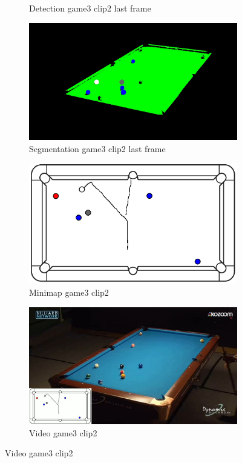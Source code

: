 \begin{figure}[H]
\begin{subfigure}[b]{0.48\textwidth}
		\caption{Detection game3 clip2 last frame}
		\label{fig: game3_clip2_last_frame_detected}
	\end{subfigure}
	\begin{subfigure}[b]{0.48\textwidth}
		\centering
		\includegraphics[width=\textwidth]{images/Segmentation/game3_clip2_segmented_balls_last_frame.jpg}
		\caption{Segmentation game3 clip2 last frame}
		\label{fig: game3_clip2_last_frame_segmented}
	\end{subfigure}
	\begin{subfigure}[b]{0.48\textwidth}
		\centering
		\includegraphics[width=\textwidth]{images/AllMinimap/game3_clip2_minimap.png}
		\caption{Minimap game3 clip2}
		\label{fig: game3_clip2_minimap}
	\end{subfigure}
	\begin{subfigure}[b]{0.48\textwidth}
		\centering
		\includegraphics[width=\textwidth]{images/Video/game3_clip2_video.jpg}
		\caption{Video game3 clip2}
		\label{fig: game3_clip2_video}
	\end{subfigure}


\end{figure}
